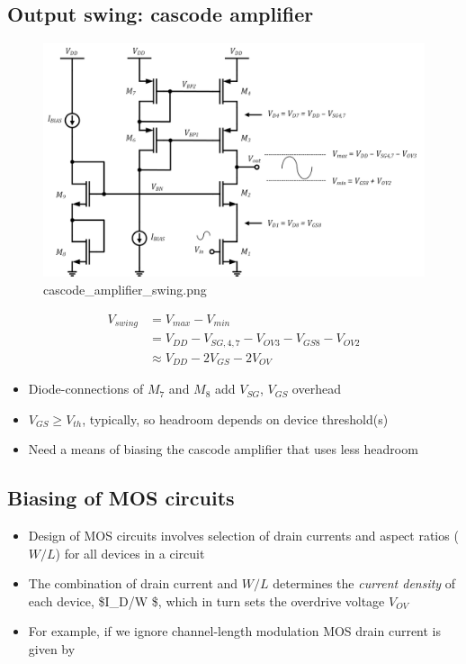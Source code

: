 \documentclass[11pt]{article}
\begin{document}
    \hypertarget{output-swing-cascode-amplifier}{%
\subsection{Output swing: cascode
amplifier}\label{output-swing-cascode-amplifier}}

    \begin{figure}
\centering
\includegraphics{cascode_amplifier_swing.png}
\caption{cascode\_amplifier\_swing.png}
\end{figure}

    \begin{align}
V_{swing} &= V_{max} - V_{min}\\
&= V_{DD} - V_{SG,4,7} - V_{OV3} - V_{GS8} - V_{OV2}\\
&\approx \boxed{ V_{DD} - 2V_{GS} - 2V_{OV} }
\end{align}

    \begin{itemize}
\item
  Diode-connections of \(M_7\) and \(M_8\) add \(V_{SG}\), \(V_{GS}\)
  overhead
\item
  \(V_{GS} \geq V_{th}\), typically, so headroom depends on device
  threshold(s)
\item
  Need a means of biasing the cascode amplifier that uses less headroom
\end{itemize}

    \hypertarget{biasing-of-mos-circuits}{%
\subsection{Biasing of MOS circuits}\label{biasing-of-mos-circuits}}

    \begin{itemize}
\item
  Design of MOS circuits involves selection of drain currents and aspect
  ratios (\(W/L\)) for all devices in a circuit
\item
  The combination of drain current and \(W/L\) determines the
  \emph{current density} of each device, \$I\_D/W \$, which in turn sets
  the overdrive voltage \(V_{OV}\)
\item
  For example, if we ignore channel-length modulation MOS drain current
  is given by
\end{itemize}
\end{document}
